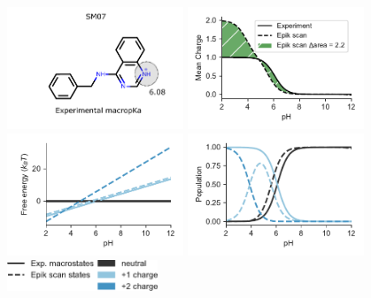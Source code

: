\documentclass[9pt,lineno,final]{elife}
\begin{document}
\begin{figure}[H]
	\centering
	
	\includegraphics[width=0.47\textwidth]{Images/Molecules/SM07-pka.pdf} \hfill
	\includegraphics[width=0.47\textwidth]{fig2_charge_sm07.pdf} \\
	
    \includegraphics[width=0.47\textwidth]{fig2_free_energy_sm07.pdf}
    \hfill
	\includegraphics[width=0.47\textwidth]{fig2_population_sm07.pdf}\\
 	\includegraphics[width=0.4\textwidth]{fig2_legend}
	

\end{figure}
\end{document}
